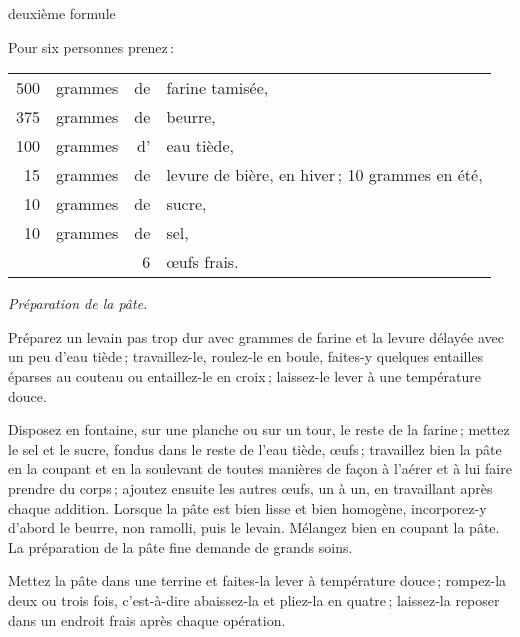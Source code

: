 \medskip
\centering\sc
\footnotesize
deuxième formule
\bigskip

\justifying
\normalfont
\normalsize

Pour six personnes prenez :

\footnotesize
\begin{longtable}{rrrp{16em}}
    500 & grammes & de & farine tamisée,                                                                  \\
    375 & grammes & de & beurre,                                                                          \\
    100 & grammes & d' & eau tiède,                                                                       \\
     15 & grammes & de & levure de bière, en hiver ; 10 grammes en été,                                   \\
     10 & grammes & de & sucre,                                                                           \\
     10 & grammes & de & sel,                                                                             \\
        &         &  6 & œufs frais.                                                                      \\
\end{longtable}
\normalsize

\begin{center}
\textit{Préparation de la pâte.}
\end{center}

Préparez un levain pas trop dur avec {\mmm} grammes de farine et la
levure délayée avec un peu d'eau tiède ; travaillez-le, roulez-le en boule,
faites-y quelques entailles éparses au couteau ou entaillez-le en croix ;
laissez-le lever à une température douce.

Disposez en fontaine, sur une planche ou sur un tour, le reste de la farine ;
mettez le sel et le sucre, fondus dans le reste de l'eau tiède, {\mmm}
œufs ; travaillez bien la pâte en la coupant et en la soulevant de toutes
manières de façon à l'aérer et à lui faire prendre du corps ; ajoutez ensuite
les autres œufs, un à un, en travaillant après chaque addition. Lorsque la pâte
est bien lisse et bien homogène, incorporez-y d'abord le beurre, non ramolli,
puis le levain. Mélangez bien en coupant la pâte. La préparation de la pâte
fine demande de grands soins.

Mettez la pâte dans une terrine et faites-la lever à température douce ;
rompez-la deux ou trois fois, c'est-à-dire abaissez-la et pliez-la en quatre ;
laissez-la reposer dans un endroit frais après chaque opération.

